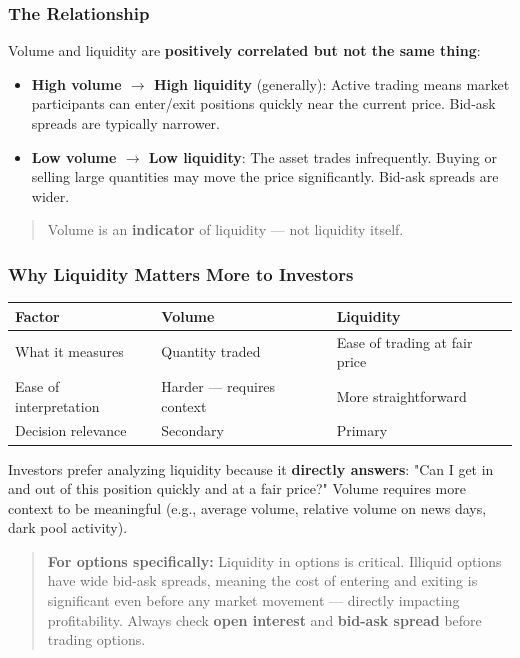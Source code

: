 \documentclass[12pt,openany]{book}
\begin{document}
\subsubsection{The Relationship}

Volume and liquidity are \textbf{positively correlated but not the same thing}:

\begin{itemize}[leftmargin=*]
    \item \textbf{High volume \(\rightarrow\) High liquidity} (generally): Active trading means market participants can enter/exit positions quickly near the current price. Bid-ask spreads are typically narrower.
    \item \textbf{Low volume \(\rightarrow\) Low liquidity}: The asset trades infrequently. Buying or selling large quantities may move the price significantly. Bid-ask spreads are wider.
\end{itemize}

\begin{quote}
Volume is an \textbf{indicator} of liquidity — not liquidity itself.
\end{quote}

\subsubsection{Why Liquidity Matters More to Investors}

\begin{center}
\scriptsize
\setlength{\tabcolsep}{3pt}
\begin{tabular}{|L{4.1cm}|L{4.1cm}|L{4.1cm}|}
\hline
\textbf{Factor} & \textbf{Volume} & \textbf{Liquidity} \\
\hline
What it measures & Quantity traded & Ease of trading at fair price \\
\hline
Ease of interpretation & Harder — requires context & More straightforward \\
\hline
Decision relevance & Secondary & Primary \\
\hline
\end{tabular}
\end{center}

Investors prefer analyzing liquidity because it \textbf{directly answers}: "Can I get in and out of this position quickly and at a fair price?" Volume requires more context to be meaningful (e.g., average volume, relative volume on news days, dark pool activity).

\begin{quote}
\textbf{For options specifically:} Liquidity in options is critical. Illiquid options have wide bid-ask spreads, meaning the cost of entering and exiting is significant even before any market movement — directly impacting profitability. Always check \textbf{open interest} and \textbf{bid-ask spread} before trading options.
\end{quote}
\end{document}

